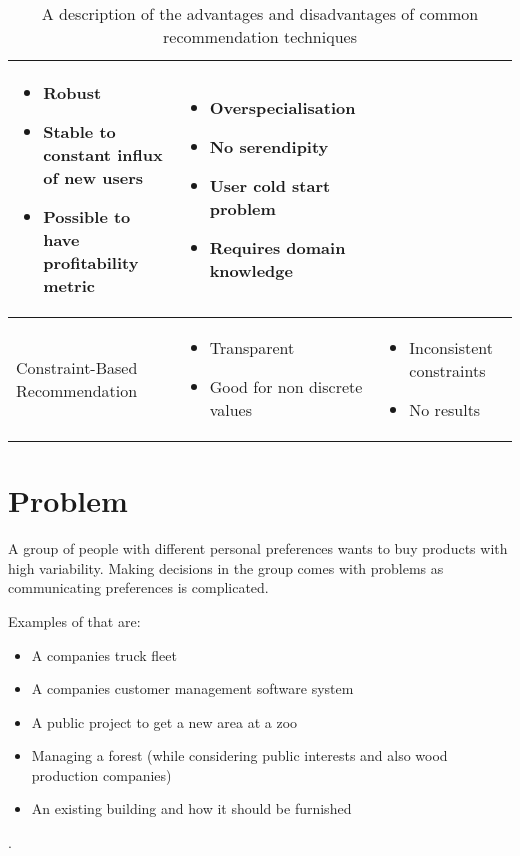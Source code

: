 \documentclass{article}
\begin{document}
\begin{table}
\begin{center}
\begin{tabularx}{\columnwidth}{X|X|X}
\begin{itemize}
                    \item Robust
                    \item Stable to constant influx of new users
                    \item Possible to have profitability metric
                \end{itemize}
            &   \begin{itemize}
                    \item Overspecialisation
                    \item No serendipity
                    \item User cold start problem
                    \item Requires domain knowledge
                \end{itemize} \\
            \hline
            Constraint-Based Recommendation 
            &   \begin{itemize}
                    \item Transparent
                    \item Good for non discrete values
                \end{itemize}
            &   \begin{itemize}
                    \item Inconsistent constraints
                    \item No results
                \end{itemize} \\ 
        \end{tabularx}
        \caption{A description of the advantages and disadvantages of common recommendation techniques}
    \end{center}
\end{table}

\FloatBarrier

\section{Problem}
A group of people with different personal preferences wants to buy products with high variability. Making decisions in the group comes with problems as communicating preferences is complicated.

Examples of that are:
\begin{itemize}
    \item A companies truck fleet
    \item A companies customer management software system
    \item A public project to get a new area at a zoo
    \item Managing a forest (while considering public interests and also wood production companies)
    \item An existing building and how it should be furnished
\end{itemize}. 
\end{document}
